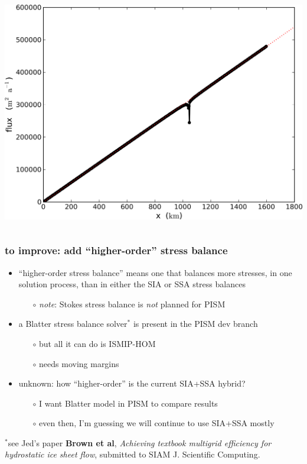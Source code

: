 \documentclass[hide notes,intlimits]{beamer}
\begin{document}
\begin{frame}
\begin{columns}
\begin{column}{0.4\textwidth}
\begin{center}
\bigskip
    \includegraphics[width=1.0\textwidth]{fluxA3}
  \end{center}
\end{column}
\end{columns}
\end{frame}


\begin{frame}
  \frametitle{to improve: add ``higher-order'' stress balance}
  \begin{itemize}
  \item ``higher-order stress balance'' means one that balances more stresses, in one solution process, than in either the SIA or SSA stress balances
    \begin{itemize}
    \item[$\circ$]  \emph{note}: Stokes stress balance is \emph{not} planned for PISM
    \end{itemize}
  \item a Blatter stress balance solver$^{*}$ is present in the PISM dev branch
    \begin{itemize}
    \item[$\circ$] but all it can do is ISMIP-HOM
    \item[$\circ$] needs moving margins
    \end{itemize}    
  \item unknown: how ``higher-order'' is the current SIA+SSA hybrid?
    \begin{itemize}
    \item[$\circ$] I want Blatter model in PISM to compare results    
    \item[$\circ$] even then, I'm guessing we will continue to use SIA+SSA mostly
    \end{itemize}    
  \end{itemize}

 \begin{flushleft}
   \scriptsize
    $^{*}$see Jed's paper \textbf{Brown et al},
    \emph{Achieving textbook multigrid efficiency for hydrostatic ice sheet
      flow}, submitted to SIAM J. Scientific Computing.
  \end{flushleft}
\end{frame}
\end{document}
